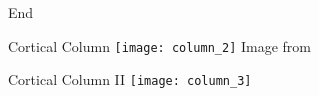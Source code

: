 
\begin{frame}[standout]
    \Huge
    End
\end{frame}

\appendix

\backupbegin

\begin{frame}[c]{Cortical Column}
    \texttt{[image: column\_2]}
    \normalsize
    Image from \cite{figcolum2}
\end{frame}

\begin{frame}[c]{Cortical Column II}
    \texttt{[image: column\_3]}
\end{frame}

\backupend

